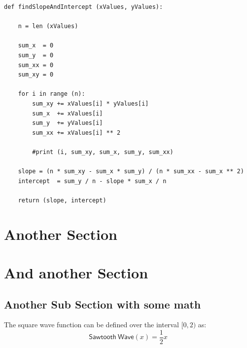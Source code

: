 \documentclass[10pt,letterpaper,twoside,final]{memoir}
\begin{document}
\begin{tcolorbox}[width=\textwidth,arc=2pt,colback=gray!10,title=Some Code]

\begin{verbatim}
def findSlopeAndIntercept (xValues, yValues):

    n = len (xValues)

    sum_x  = 0
    sum_y  = 0
    sum_xx = 0
    sum_xy = 0

    for i in range (n):
        sum_xy += xValues[i] * yValues[i]
        sum_x  += xValues[i]
        sum_y  += yValues[i]
        sum_xx += xValues[i] ** 2

        #print (i, sum_xy, sum_x, sum_y, sum_xx)

    slope = (n * sum_xy - sum_x * sum_y) / (n * sum_xx - sum_x ** 2)
    intercept  = sum_y / n - slope * sum_x / n

    return (slope, intercept) 
\end{verbatim}
\end{tcolorbox}

\lipsum[34]

\section{Another Section}

\lipsum[34-35]

\section{And another Section}

\lipsum[4-5]

\subsection{Another Sub Section with some math}

\lipsum[6-7]
The square wave function can be defined over the interval $[0, 2)$ as:
\[
\mathsf{Sawtooth\ Wave}(x) = \frac{1}{2} x 
\]
\end{document}
